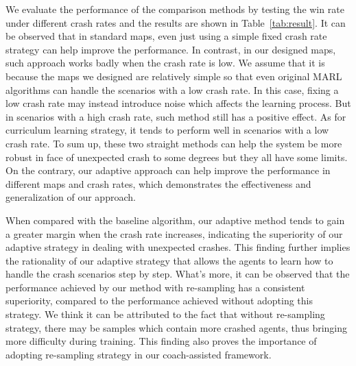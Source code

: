 \documentclass{article}
\begin{document}
We evaluate the performance of the comparison methods by testing the win rate under different crash rates and the results are shown in Table~\ref{tab:result}. It can be observed that in standard maps, even just using a simple fixed crash rate strategy can help improve the performance. In contrast, in our designed maps, such approach works badly when the crash rate is low. We assume that it is because the maps we designed are relatively simple so that even original MARL algorithms can handle the scenarios with a low crash rate. In this case, fixing a low crash rate may instead introduce noise which affects the learning process. But in scenarios with a high crash rate, such method still has a positive effect. As for curriculum learning strategy, it tends to perform well in scenarios with a low crash rate. To sum up, these two straight methods can help the system be more robust in face of unexpected crash to some degrees but they all have some limits. On the contrary, our adaptive approach can help improve the performance in different maps and crash rates, which demonstrates the effectiveness and generalization of our approach. 

When compared with the baseline algorithm, our adaptive method tends to gain a greater margin when the crash rate increases, indicating the superiority of our adaptive strategy in dealing with unexpected crashes. This finding further implies the rationality of our adaptive strategy that allows the agents to learn how to handle the crash scenarios step by step. What's more, it can be observed that the performance achieved by our method with re-sampling has a consistent superiority, compared to the performance achieved without adopting this strategy. We think it can be attributed to the fact that without re-sampling strategy, there may be samples which contain more crashed agents, thus bringing more difficulty during training. This finding also proves the importance of adopting re-sampling strategy in our coach-assisted framework.
\end{document}
